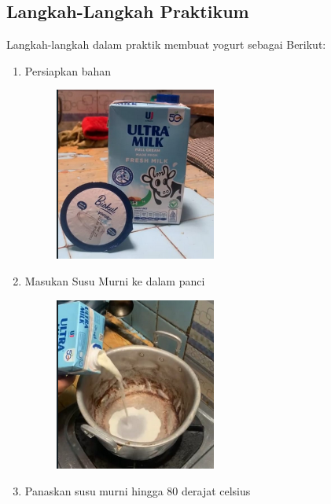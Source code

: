 \documentclass[a4paper,12pt, left=3cm,right=2cm,bottom=2cm, bahasa]{article}
\begin{document}
\subsection{Langkah-Langkah Praktikum}
Langkah-langkah dalam praktik membuat yogurt sebagai Berikut:
\begin{enumerate}
\item Persiapkan bahan 
  \begin{figure}[H]
  \begin{center}
    \includegraphics[width=0.5\textwidth]{images/gambar5.png}
  \end{center}
\end{figure}
\item  Masukan    Susu    Murni   ke      dalam     panci                                                     
  \begin{figure}[H]
  \begin{center}
    \includegraphics[width=0.5\textwidth]{images/gambar1.png}
  \end{center}
\end{figure}
\item  Panaskan   susu    murni   hingga  80        derajat  celsius                                          

\end{enumerate}
\end{document}

